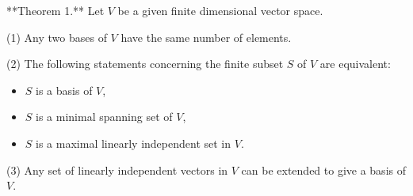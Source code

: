 **Theorem 1.** Let $V$ be a given finite dimensional vector space.

(1) Any two bases of $V$ have the same number of elements.

(2) The following statements concerning the finite subset $S$ of $V$ are equivalent:
\begin{itemize}
\item[(i)] $S$ is a basis of $V$,
\item[(ii)] $S$ is a minimal spanning set of $V$,
\item[(iii)] $S$ is a maximal linearly independent set in $V$.
\end{itemize}

(3) Any set of linearly independent vectors in $V$ can be extended to give a basis of $V$.
